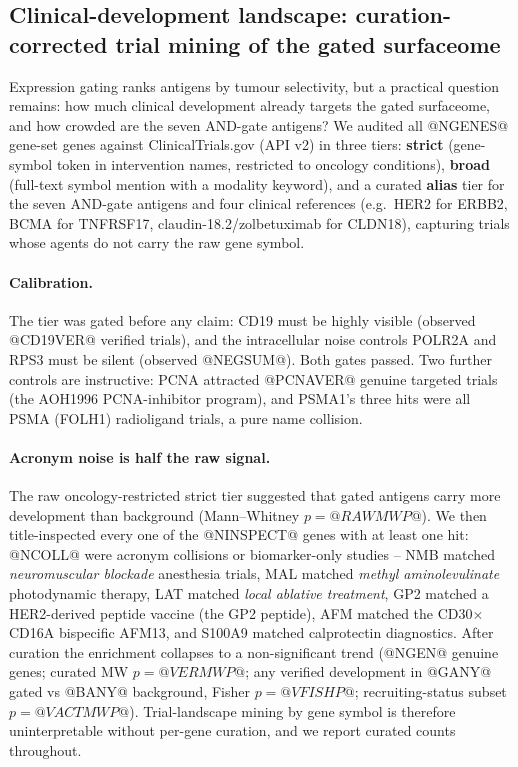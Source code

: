 \subsection{Clinical-development landscape: curation-corrected trial mining of the gated surfaceome}
\label{sec:clintrials}
Expression gating ranks antigens by tumour selectivity, but a practical question
remains: how much clinical development already targets the gated surfaceome, and
how crowded are the seven AND-gate antigens? We audited all @NGENES@ gene-set
genes against ClinicalTrials.gov (API v2) in three tiers: \textbf{strict}
(gene-symbol token in intervention names, restricted to oncology conditions),
\textbf{broad} (full-text symbol mention with a modality keyword), and a curated
\textbf{alias} tier for the seven AND-gate antigens and four clinical references
(e.g.\ HER2 for ERBB2, BCMA for TNFRSF17, claudin-18.2/zolbetuximab for CLDN18),
capturing trials whose agents do not carry the raw gene symbol.

\paragraph{Calibration.} The tier was gated before any claim: CD19 must be
highly visible (observed @CD19VER@ verified trials), and the intracellular
noise controls POLR2A and RPS3 must be silent (observed @NEGSUM@). Both gates
passed. Two further controls are instructive: PCNA attracted @PCNAVER@ genuine
targeted trials (the AOH1996 PCNA-inhibitor program), and PSMA1's three hits
were all PSMA (FOLH1) radioligand trials, a pure name collision.

\paragraph{Acronym noise is half the raw signal.} The raw oncology-restricted
strict tier suggested that gated antigens carry more development than background
(Mann--Whitney $p = @RAWMWP@$). We then title-inspected every one of the
@NINSPECT@ genes with at least one hit: @NCOLL@ were acronym collisions or
biomarker-only studies -- NMB matched \emph{neuromuscular blockade} anesthesia
trials, MAL matched \emph{methyl aminolevulinate} photodynamic therapy, LAT
matched \emph{local ablative treatment}, GP2 matched a HER2-derived peptide
vaccine (the GP2 peptide), AFM matched the CD30$\times$CD16A bispecific AFM13,
and S100A9 matched calprotectin diagnostics. After curation the enrichment
collapses to a non-significant trend (@NGEN@ genuine genes; curated MW
$p = @VERMWP@$; any verified development in @GANY@ gated vs @BANY@ background,
Fisher $p = @VFISHP@$; recruiting-status subset $p = @VACTMWP@$). Trial-landscape
mining by gene symbol is therefore uninterpretable without per-gene curation,
and we report curated counts throughout.

